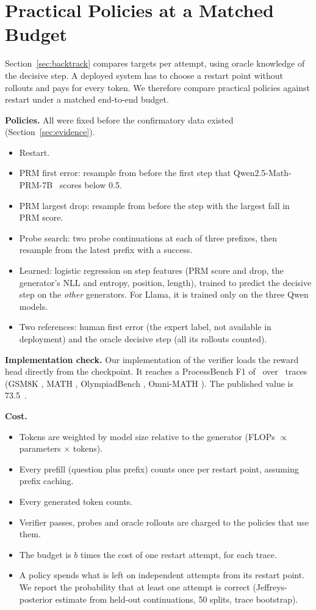 \section{Practical Policies at a Matched Budget}\label{sec:policies}
Section~\ref{sec:backtrack} compares targets per attempt, using oracle knowledge of the decisive
step. A deployed system has to choose a restart point without rollouts and pays for every token. We
therefore compare practical policies against restart under a matched end-to-end budget.

\textbf{Policies.} All were fixed before the confirmatory data existed (Section~\ref{sec:evidence}).
\begin{itemize}
\item Restart.
\item PRM first error: resample from before the first step that Qwen2.5-Math-PRM-7B~\cite{zhang2025lessons}
scores below 0.5.
\item PRM largest drop: resample from before the step with the largest fall in PRM score.
\item Probe search: two probe continuations at each of three prefixes, then resample from the
latest prefix with a success.
\item Learned: logistic regression on step features (PRM score and drop, the generator's NLL and
entropy, position, length), trained to predict the decisive step on the \emph{other} generators.
For Llama, it is trained only on the three Qwen models.
\item Two references: human first error (the expert label, not available in deployment) and the
oracle decisive step (all its rollouts counted).
\end{itemize}

\textbf{Implementation check.} Our implementation of the verifier loads the reward head directly
from the checkpoint. It reaches a ProcessBench F1 of \prmFOne\ over \PrmTraces\ traces
(GSM8K \prmFOneGsm, MATH \prmFOneMath, OlympiadBench \prmFOneOlym, Omni-MATH \prmFOneOmni). The
published value is 73.5~\cite{zhang2025lessons}.

\textbf{Cost.}
\begin{itemize}
\item Tokens are weighted by model size relative to the generator (FLOPs $\propto$ parameters
$\times$ tokens).
\item Every prefill (question plus prefix) counts once per restart point, assuming prefix caching.
\item Every generated token counts.
\item Verifier passes, probes and oracle rollouts are charged to the policies that use them.
\item The budget is $b$ times the cost of one restart attempt, for each trace.
\item A policy spends what is left on independent attempts from its restart point. We report the
probability that at least one attempt is correct (Jeffreys-posterior estimate from held-out
continuations, 50 splits, trace bootstrap).
\end{itemize}

